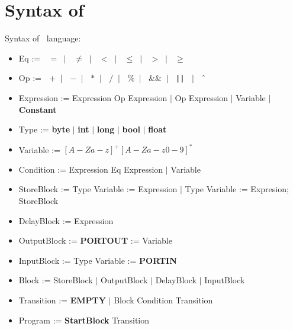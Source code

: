 \clearpage
\section{Syntax of \plcchart}
\label{sec:statechartsyn}

Syntax of \plcchart $\:$ language:
\begin{definition}
\plcchart

\begin{itemize}
	\item Eq := $\;$ \boldmath$=$\unboldmath $\; \mid \;$ \boldmath$\neq$\unboldmath $\; \mid \;$ \boldmath$<$\unboldmath $\; \mid \;$ \boldmath$\leq$\unboldmath $\; \mid \;$ \boldmath$>$\unboldmath $\; \mid \;$ \boldmath$\geq$\unboldmath	
	\item Op := $\;$ \boldmath$+$\unboldmath $\; \mid \;$ \boldmath$-$\unboldmath $\; \mid \;$ \boldmath$*$\unboldmath $\; \mid \;$ \boldmath$/$\unboldmath $\; \mid \;$ \boldmath$\%$\unboldmath $\; \mid \;$ \boldmath$\&\&$\unboldmath $\; \mid \;$ \textbf{\texttt{||}} $\; \mid \;$ \boldmath$\mathbin{\char`\^}$\unboldmath

	\item Expression := Expression Op Expression $\mid$ Op Expression $\mid$ Variable $\mid$ \textbf{Constant}
	
	\item Type := \textbf{byte} $\mid$ \textbf{int} $\mid$ \textbf{long} $\mid$ \textbf{bool} $\mid$ \textbf{float}
	\item Variable := $[A-Za-z]^+[A-Za-z0-9]^*$

	\item Condition := Expression Eq Expression $\mid$ Variable

		
	\item StoreBlock := Type Variable := Expression $\mid$ Type Variable := Expresion; StoreBlock
	\item DelayBlock := Expression
	\item OutputBlock := \textbf{PORTOUT} := Variable
	\item InputBlock := Type Variable := \textbf{PORTIN}
	\item Block := StoreBlock $\mid$ OutputBlock $\mid$ DelayBlock $\mid$ InputBlock

	
	\item Transition := \textbf{EMPTY} $\mid$ Block Condition Transition
	
	\item Program := \textbf{StartBlock} Transition
\end{itemize}
\end{definition}

